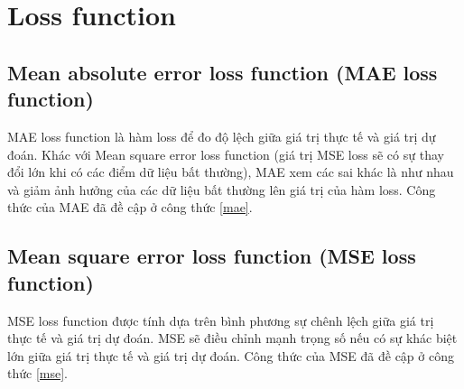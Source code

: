 \section{Loss function}
\subsection{Mean absolute error loss function (MAE loss function)}
MAE loss function là hàm loss để đo độ lệch giữa giá trị thực tế và giá trị dự đoán. Khác với Mean square error loss function (giá trị MSE loss sẽ có sự thay đổi lớn khi có các điểm dữ liệu bất thường), MAE xem các sai khác là như nhau và giảm ảnh hưởng của các dữ liệu bất thường lên giá trị của hàm loss. Công thức của MAE đã đề cập ở công thức \ref{mae}.

\subsection{Mean square error loss function (MSE loss function)}
MSE loss function được tính dựa trên bình phương sự chênh lệch giữa giá trị thực tế và giá trị dự đoán. MSE sẽ điều chỉnh mạnh trọng số nếu có sự khác biệt lớn giữa giá trị thực tế và giá trị dự đoán. Công thức của MSE đã đề cập ở công thức \ref{mse}.

